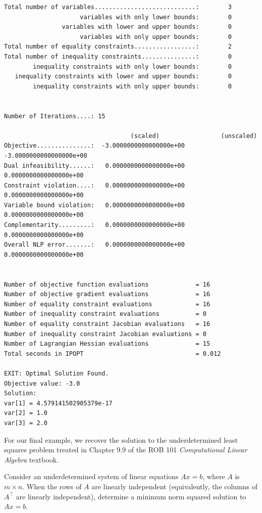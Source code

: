 \begin{verbatim}
Total number of variables............................:        3
                     variables with only lower bounds:        0
                variables with lower and upper bounds:        0
                     variables with only upper bounds:        0
Total number of equality constraints.................:        2
Total number of inequality constraints...............:        0
        inequality constraints with only lower bounds:        0
   inequality constraints with lower and upper bounds:        0
        inequality constraints with only upper bounds:        0


Number of Iterations....: 15

                                   (scaled)                 (unscaled)
Objective...............:  -3.0000000000000000e+00   -3.0000000000000000e+00
Dual infeasibility......:   0.0000000000000000e+00    0.0000000000000000e+00
Constraint violation....:   0.0000000000000000e+00    0.0000000000000000e+00
Variable bound violation:   0.0000000000000000e+00    0.0000000000000000e+00
Complementarity.........:   0.0000000000000000e+00    0.0000000000000000e+00
Overall NLP error.......:   0.0000000000000000e+00    0.0000000000000000e+00


Number of objective function evaluations             = 16
Number of objective gradient evaluations             = 16
Number of equality constraint evaluations            = 16
Number of inequality constraint evaluations          = 0
Number of equality constraint Jacobian evaluations   = 16
Number of inequality constraint Jacobian evaluations = 0
Number of Lagrangian Hessian evaluations             = 15
Total seconds in IPOPT                               = 0.012

EXIT: Optimal Solution Found.
Objective value: -3.0
Solution: 
var[1] = 4.579141502905379e-17
var[2] = 1.0
var[3] = 2.0
\end{verbatim}


For our final example, we recover the solution to the underdetermined least squares problem treated in Chapter 9.9 of the ROB 101 \textit{Computational Linear Algebra} textbook.

\begin{example} Consider an underdetermined system of linear equations $Ax=b$, where $A$ is $m \times n$. When the rows of $A$ are linearly independent (equivalently, the columns of $A^\top$ are linearly independent), determine a minimum norm squared solution to $Ax = b$.    
\end{example}


